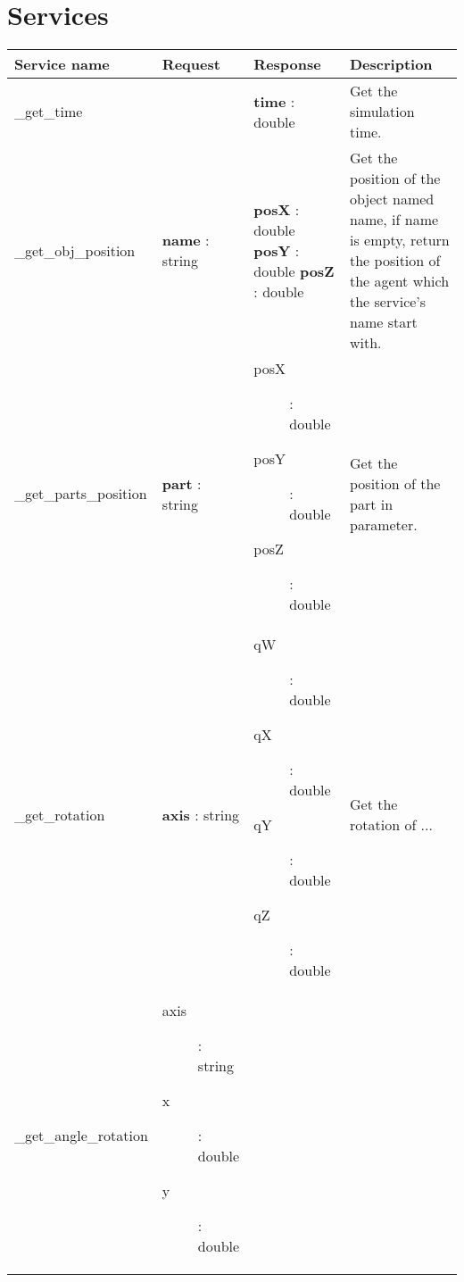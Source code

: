 \section{Services}\label{annex:services}
\begin{supertabular}{|p{2.9cm}|p{2.5cm}|p{3cm}|p{5.5cm}|}
	\hline
    Service name & Request & Response & Description \\
  	\hline
  	\_get\_time &  & \textbf{time} : double & Get the simulation time.\\
  	\hline
  	\medskip
  	\_get\_obj\_position & \medskip \textbf{name} : string & 
  		\textbf{posX} : double \newline
  		\textbf{posY} : double \newline
  		\textbf{posZ} : double
  		 & Get the position of the object named name, if name is empty, return the position of the agent which the service's name start with.\\
  	\hline
  	\_get\_parts\_position & \textbf{part} : string & 
  		\begin{minipage}{3cm}
  			\medskip
  			\begin{description} 
  				\item[posX] : double 
  				\item[posY] : double 
  				\item[posZ] : double
  			\end{description}
  			\medskip
  		\end{minipage} & Get the position of the part in parameter.\\
  	\hline
  	\_get\_rotation & \textbf{axis} : string & 
  		\begin{minipage}{3cm}
  			\medskip
  			\begin{description} 
  				\item[qW] : double 
  				\item[qX] : double 
  				\item[qY] : double
  				\item[qZ] : double
  			\end{description}
  			\medskip
  		\end{minipage} & Get the rotation of ...\\
  	\hline
  	\_get\_angle\_rotation & 
  		\begin{minipage}{3cm}
  			\medskip
  			\begin{description} 
  				\item[axis] : string
  				\item[x] : double 
  				\item[y] : double 

\end{description}
\end{minipage}
\end{supertabular}
